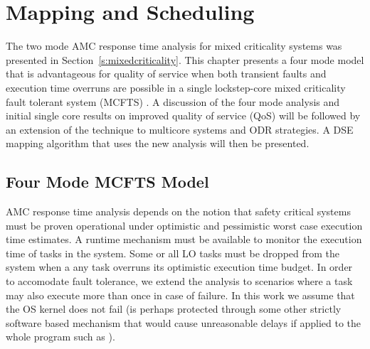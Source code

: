 
\chapter{Mapping and Scheduling} %

\label{c:sched} %


	The two mode AMC response time analysis for mixed criticality systems was presented in Section~\ref{s:mixedcriticality}. 
	This chapter presents a four mode model that is advantageous for quality of service when both transient faults and execution time overruns are possible in a single lockstep-core mixed criticality fault tolerant system (MCFTS) \cite{albayati2016modes}. 
	A discussion of the four mode analysis and initial single core results on improved quality of service (QoS) will be followed by an extension of the technique to multicore systems and ODR strategies. 
	A DSE mapping algorithm that uses the new analysis will then be presented.

\section{Four Mode MCFTS Model}
\label{s:mcfts}
	AMC response time analysis depends on the notion that safety critical systems must be proven operational under optimistic and pessimistic worst case execution time estimates. 
	A runtime mechanism must be available to monitor the execution time of tasks in the system.
	Some or all LO tasks must be dropped from the system when a any task overruns its optimistic execution time budget.
	In order to accomodate fault tolerance, we extend the analysis to scenarios where a task may also execute more than once in case of failure.
	In this work we assume that the OS kernel does not fail (is perhaps protected through some other strictly software based mechanism that would cause unreasonable delays if applied to the whole program such as \cite{reis2005swift}).
	
